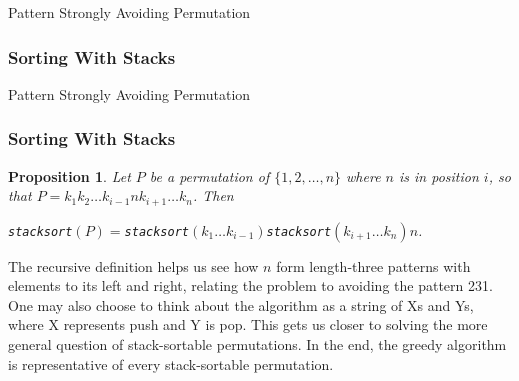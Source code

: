 \documentclass{beamer}  %
\newtheorem{prop}{Proposition}
\begin{document}
\begin{frame}{Pattern Strongly Avoiding Permutation}
    \frametitle{Sorting With Stacks}
    \begin{center}
    \end{center}
\end{frame}

\begin{frame}{Pattern Strongly Avoiding Permutation}
    \frametitle{Sorting With Stacks}
    \begin{prop}
        Let $P$ be a permutation of $\{1,2,\ldots,n\}$ where $n$ is in position $i$, so that $P=k_1k_2\ldots k_{i-1}nk_{i+1}\ldots k_n$. Then \begin{center}\texttt{stacksort}$(P)=$\texttt{stacksort}$(k_1\ldots k_{i-1})$\texttt{stacksort}$(k_{i+1}\ldots k_n)n$.
        \end{center}
    \end{prop}
    The recursive definition helps us see how $n$ form length-three patterns with elements to its left and right, relating the problem to avoiding the pattern 231. \\
    One may also choose to think about the algorithm as a string of Xs and Ys, where X represents push and Y is pop. This gets us closer to solving the more general question of stack-sortable permutations. In the end, the greedy algorithm is representative of every stack-sortable permutation.
\end{frame}
\end{document}
